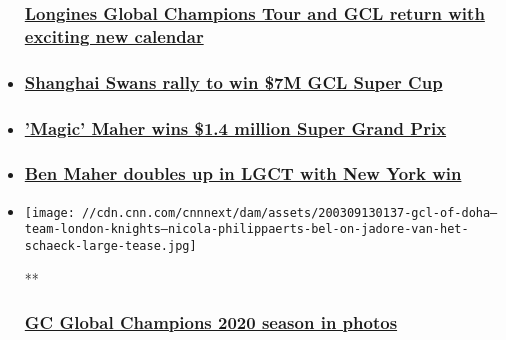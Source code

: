 \begin{itemize}
{  \subsubsection{\texorpdfstring{\href{/2020/01/24/sport/longines-gct-gcl-preview-2020-spt-intl/index.html}{Longines
  Global Champions Tour and GCL return with exciting new
  calendar}}{Longines Global Champions Tour and GCL return with exciting new calendar}}\label{longines-global-champions-tour-and-gcl-return-with-exciting-new-calendar}}
\item
  \hypertarget{shanghai-swans-rally-to-win-7m-gcl-super-cup-}{%
  \subsubsection{\texorpdfstring{\href{/2019/11/24/sport/swans-wins-gcl-super-cup/index.html}{Shanghai
  Swans rally to win \$7M GCL Super Cup
  }}{Shanghai Swans rally to win \$7M GCL Super Cup }}\label{shanghai-swans-rally-to-win-7m-gcl-super-cup-}}
\item
  \hypertarget{magic-maher-wins-14-million-super-grand-prix}{%
  \subsubsection{\texorpdfstring{\href{/2019/11/23/sport/maher-wins-lgct-prague/index.html}{'Magic'
  Maher wins \$1.4 million Super Grand
  Prix}}{'Magic' Maher wins \$1.4 million Super Grand Prix}}\label{magic-maher-wins-14-million-super-grand-prix}}
\item
  \hypertarget{ben-maher-doubles-up-in-lgct-with-new-york-win}{%
  \subsubsection{\texorpdfstring{\href{/2019/09/28/sport/eq-new-york-maher/index.html}{Ben
  Maher doubles up in LGCT with New York
  win}}{Ben Maher doubles up in LGCT with New York win}}\label{ben-maher-doubles-up-in-lgct-with-new-york-win}}
\end{itemize}

\begin{itemize}
\item
  \href{/2020/03/09/sport/gallery/gct-2020-season-in-photos/index.html}{}

  \texttt{[image: //cdn.cnn.com/cnnnext/dam/assets/200309130137-gcl-of-doha---team-london-knights---nicola-philippaerts-bel-on-jadore-van-het-schaeck-large-tease.jpg]}

  **

  \hypertarget{gc-global-champions-2020-season-in-photos}{%
  \subsubsection{\texorpdfstring{\href{/2020/03/09/sport/gallery/gct-2020-season-in-photos/index.html}{GC
  Global Champions 2020 season in
  photos}}{GC Global Champions 2020 season in photos}}\label{gc-global-champions-2020-season-in-photos}}
\end{itemize}

